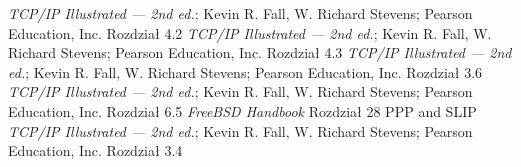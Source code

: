 \begin{thebibliography}{99}
    \emph{TCP/IP Illustrated --- 2nd ed.}; Kevin R. Fall, W. Richard Stevens; Pearson Education, Inc.
    Rozdział 4.2
    \emph{TCP/IP Illustrated --- 2nd ed.}; Kevin R. Fall, W. Richard Stevens; Pearson Education, Inc.
    Rozdział 4.3
    \emph{TCP/IP Illustrated --- 2nd ed.}; Kevin R. Fall, W. Richard Stevens; Pearson Education, Inc.
    Rozdział 3.6
    \emph{TCP/IP Illustrated --- 2nd ed.}; Kevin R. Fall, W. Richard Stevens; Pearson Education, Inc.
    Rozdział 6.5
    \emph{FreeBSD Handbook}
    Rozdział 28 PPP and SLIP
    \emph{TCP/IP Illustrated --- 2nd ed.}; Kevin R. Fall, W. Richard Stevens; Pearson Education, Inc.
    Rozdział 3.4
\end{thebibliography}
